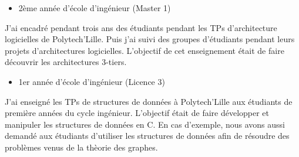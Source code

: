 \documentclass[10pt,a4paper,ragged2e,withhyper]{altacv}
\begin{document}










\begin{itemize}
\item 2ème année d'école d'ingénieur (Master 1)
\end{itemize}

J'ai encadré pendant trois ans des étudiants pendant les TPs d'architecture logicielles de Polytech'Lille.
Puis j'ai suivi des groupes d'étudiants pendant leurs projets d'architectures logicielles.
L'objectif de cet enseignement était de faire découvrir les architectures 3-tiers.

\divider

\begin{itemize}
\item 1er année d'école d'ingénieur (Licence 3)
\end{itemize}

J'ai enseigné les TPs de structures de données à Polytech'Lille aux étudiants de première années du cycle ingénieur.
L'objectif était de faire développer et manipuler les structures de données en C.
En cas d'exemple, nous avons aussi demandé aux étudiants d'utiliser les structures de données afin de résoudre des problèmes venus de la thèorie des graphes.
\end{document}
